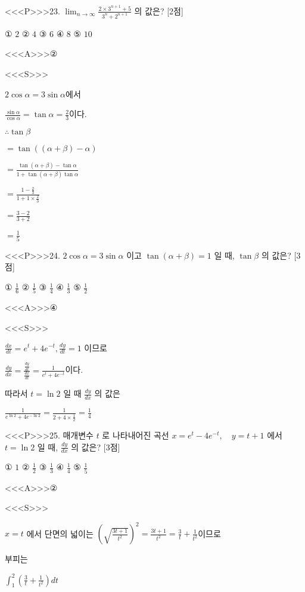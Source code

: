 \documentclass{oblivoir}
\begin{document}
<<<P>>>23. $\lim _{n \rightarrow \infty} \frac{2 \times 3^{n+1}+5}{3^{n}+2^{n+1}}$ 의 값은? [2점]

① $2$
② $4$
③ $6$
④ $8$
⑤ $10$


<<<A>>>②

<<<S>>>



$ 2 \cos \alpha =3 \sin \alpha$에서 

$\frac{\sin \alpha}{\cos \alpha}=\tan \alpha=\frac{2}{3}$이다.

$\therefore \tan \beta$

$=\tan ((\alpha+\beta)-\alpha)$

$=\frac{\tan (\alpha+\beta)-\tan \alpha}{1+\tan (\alpha+\beta) \tan \alpha}$

$= \frac{1-\frac{2}{3}}{1+1 \times \frac{2}{3}}$

$=\frac{3-2}{3+2}$

$=\frac{1}{5} $


<<<P>>>24. $2 \cos \alpha=3 \sin \alpha$ 이고 $\tan (\alpha+\beta)=1$ 일 때, $\tan \beta$ 의 값은?
[3점]

① $\frac{1}{6}$
② $\frac{1}{5}$
③ $\frac{1}{4}$
④ $\frac{1}{3}$
⑤ $\frac{1}{2}$


<<<A>>>④

<<<S>>>



$ \frac{d x}{d t}=e^{t}+4 e^{-t}, \frac{d y}{d t}=1$ 이므로

$\frac{d y}{d x}=\frac{\frac{d y}{d t}}{\frac{d x}{d t}}=\frac{1}{e^{t}+4 e^{-t}}$이다.

따라서 $t=\ln 2$ 일 때 $\frac{d y}{d x}$ 의 값은

$\frac{1}{e^{\ln 2}+4 e^{-\ln 2}}=\frac{1}{2+4 \times \frac{1}{2}}=\frac{1}{4}
$


<<<P>>>25. 매개변수 $t$ 로 나타내어진 곡선
$ x=e^{t}-4 e^{-t}, \quad y=t+1 $
에서 $t=\ln 2$ 일 때, $\frac{d y}{d x}$ 의 값은? [3점]

① $1$
② $\frac{1}{2}$
③ $\frac{1}{3}$
④ $\frac{1}{4}$
⑤ $\frac{1}{5}$



<<<A>>>②

<<<S>>>



$x=t$ 에서 단면의 넓이는
$\left(\sqrt{\frac{3 t+1}{t^{2}}}\right)^{2}=\frac{3 t+1}{t^{2}}=\frac{3}{t}+\frac{1}{t^{2}}$이므로

부피는

$\int_{1}^{2}\left(\frac{3}{t}+\frac{1}{t^{2}}\right) d t $
\end{document}
